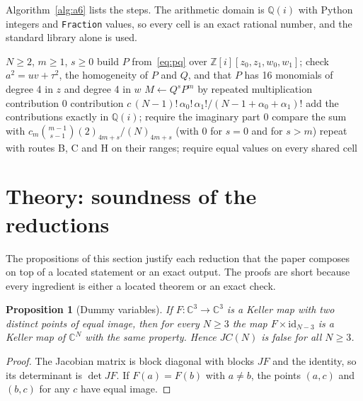 \documentclass[11pt]{article}
\newtheorem{proposition}{Proposition}
\theoremstyle{remark}
\newcommand{\C}{\mathbb{C}}
\newcommand{\Q}{\mathbb{Q}}
\begin{document}
Algorithm~\ref{alg:a6} lists the steps. The arithmetic domain is $\Q(i)$ with Python integers and \texttt{Fraction} values, so every cell is an exact rational number, and the standard library alone is used.

\begin{algorithm}[t]
\caption{A6, exact Haar moments of Long's pair on $SU(N)$ by the sphere moments of route A.}\label{alg:a6}
\begin{algorithmic}[1]
\Require $N\ge2$, $m\ge1$, $s\ge0$
\State build $P$ from~\eqref{eq:pq} over $\mathbb Z[i][z_0,z_1,w_0,w_1]$; check $a^2=uv+\tau^2$, the homogeneity of $P$ and $Q$, and that $P$ has 16 monomials of degree 4 in $z$ and degree 4 in $w$
\State $M\gets Q^sP^m$ by repeated multiplication
\If{$\alpha\ne\beta$} \State contribution $0$
\Else \State contribution $c\,(N-1)!\,\alpha_0!\,\alpha_1!/(N-1+\alpha_0+\alpha_1)!$ \EndIf
\EndFor
\State add the contributions exactly in $\Q(i)$; require the imaginary part $0$
\State compare the sum with $c_m\binom{m-1}{s-1}(2)_{4m+s}/(N)_{4m+s}$ (with $0$ for $s=0$ and for $s>m$)
\State repeat with routes B, C and H on their ranges; require equal values on every shared cell
\end{algorithmic}
\end{algorithm}

\section{Theory: soundness of the reductions}\label{sec:theory}

The propositions of this section justify each reduction that the paper composes on top of a located statement or an exact output. The proofs are short because every ingredient is either a located theorem or an exact check.

\begin{proposition}[Dummy variables]\label{prop:dummy}
If $F:\C^3\to\C^3$ is a Keller map with two distinct points of equal image, then for every $N\ge3$ the map $F\times\mathrm{id}_{N-3}$ is a Keller map of $\C^N$ with the same property. Hence $JC(N)$ is false for all $N\ge3$.
\end{proposition}
\begin{proof}
The Jacobian matrix is block diagonal with blocks $JF$ and the identity, so its determinant is $\det JF$. If $F(a)=F(b)$ with $a\ne b$, the points $(a,c)$ and $(b,c)$ for any $c$ have equal image. \qedhere
\end{proof}
\end{document}
